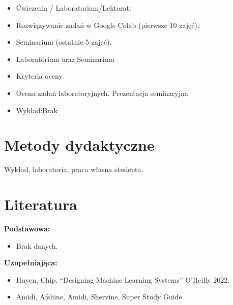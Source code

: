 \documentclass[12pt, a4paper]{article}
\begin{document}
\begin{itemize}
  \item Ćwiczenia / Laboratorium/Lektorat:
  \item Rozwiązywanie zadań w Google Colab (pierwsze 10 zajęć).
  \item Seminarium (ostatnie 5 zajęć).
  \item Laboratorium oraz Seminarium
  \item Kryteria oceny
  \item Ocena zadań laboratoryjnych.  Prezentacja seminaryjna
  \item Wykład:Brak
\end{itemize}

\section{Metody dydaktyczne}

Wykład, laboratoria, praca własna studenta.

\section{Literatura}

\textbf{Podstawowa:}
\begin{itemize}
  \item Brak danych.
\end{itemize}

\textbf{Uzupełniająca:}
\begin{itemize}
  \item Huyen, Chip. “Designing Machine Learning Systems” O’Reilly 2022.
  \item Amidi, Afshine, Amidi, Shervine, Super Study Guide
\end{itemize}
\end{document}

